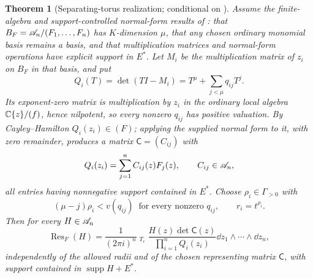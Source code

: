 \documentclass[11pt,letterpaper]{article}
\newtheorem{theorem}{Theorem}[section]
\theoremstyle{definition}
\theoremstyle{remark}
\newcommand{\supp}{\operatorname{supp}}\newcommand{\Res}{\operatorname{Res}}
\newcommand{\HInt}{\mathop{\int^{\!H}}\nolimits}
\numberwithin{equation}{section}
\begin{document}
\begin{theorem}[Separating-torus realization; conditional on \cite{Geometry}]
\label{contours:thm:septorus}
\emph{Assume the finite-algebra and support-controlled normal-form results of
\cite[\S\S7--9]{Geometry}}: that $B_F=\mathscr A_n/(F_1,\ldots,F_n)$ has $K$-dimension
$\mu$, that any chosen ordinary monomial basis remains a basis, and that
multiplication matrices and normal-form operations have explicit support in $E^*$.
Let $M_i$ be the multiplication matrix of $z_i$ on $B_F$ in that basis, and put
\begin{equation}\label{contours:eq:Qi}
  Q_i(T)=\det(TI-M_i)=T^\mu+\sum_{j<\mu}q_{ij}T^j .
\end{equation}
Its exponent-zero matrix is multiplication by $z_i$ in the ordinary local algebra
$\mathbb C\{z\}/(f)$, hence nilpotent, so every nonzero $q_{ij}$ has positive valuation. By
Cayley--Hamilton $Q_i(z_i)\in(F)$; applying the supplied normal form to it, with
zero remainder, produces a matrix $\mathsf C=(C_{ij})$ with
\begin{equation}\label{contours:eq:matrixC}
  Q_i(z_i)=\sum_{j=1}^nC_{ij}(z)F_j(z),\qquad C_{ij}\in\mathscr A_n,
\end{equation}
all entries having nonnegative support contained in $E^*$. Choose
$\rho_i\in\Gamma_{>0}$ with
\begin{equation}\label{contours:eq:torusradius}
  (\mu-j)\rho_i<v(q_{ij})\ \text{ for every nonzero }q_{ij},
  \qquad r_i=t^{\rho_i} .
\end{equation}
Then for every $H\in\mathscr A_n$
\begin{equation}\label{contours:eq:septorus}
 \boxed{\quad
 \Res_F(H)=\frac1{(2\pi i)^n}\HInt_{T_r}
 \frac{H(z)\det\mathsf C(z)}{\prod_{i=1}^nQ_i(z_i)}
 \dd z_1\wedge\cdots\wedge \dd z_n ,
 \quad}
\end{equation}
independently of the allowed radii and of the chosen representing matrix
$\mathsf C$, with support contained in $\supp H+E^*$.
\end{theorem}
\end{document}
